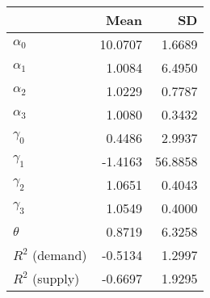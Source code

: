 
\begin{tabular}[t]{lrr}
\toprule
  & Mean & SD\\
\midrule
$\alpha_{0}$ & 10.0707 & 1.6689\\
$\alpha_{1}$ & 1.0084 & 6.4950\\
$\alpha_{2}$ & 1.0229 & 0.7787\\
$\alpha_{3}$ & 1.0080 & 0.3432\\
$\gamma_{0}$ & 0.4486 & 2.9937\\
$\gamma_{1}$ & -1.4163 & 56.8858\\
$\gamma_{2}$ & 1.0651 & 0.4043\\
$\gamma_{3}$ & 1.0549 & 0.4000\\
$\theta$ & 0.8719 & 6.3258\\
$R^{2}$ (demand) & -0.5134 & 1.2997\\
$R^{2}$ (supply) & -0.6697 & 1.9295\\
\bottomrule
\end{tabular}

